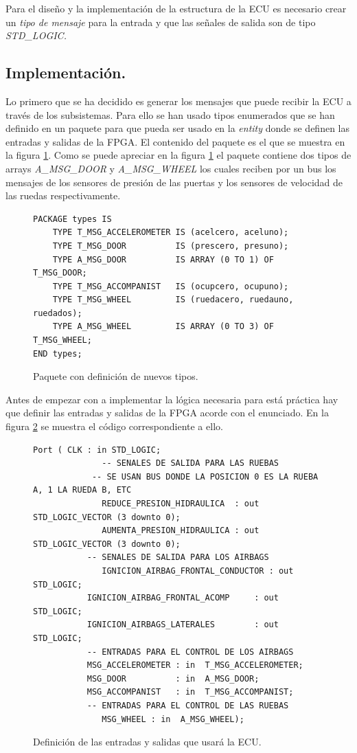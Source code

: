 \documentclass{article}
\begin{document}
Para el diseño y la implementación de la estructura de la ECU es necesario crear un \emph{tipo de mensaje} para la entrada y que las señales de salida son de tipo \emph{STD\_LOGIC.}

\subsection{Implementación.}

	Lo primero que se ha decidido es generar los mensajes que puede recibir la ECU a través de los subsistemas. Para ello se han usado tipos enumerados que se han definido en un paquete para que pueda ser usado en la \emph{entity} donde se definen las entradas y salidas de la FPGA. El contenido del paquete es el que se muestra en la figura \ref{cod:p4:package}. Como se puede apreciar en la figura \ref{cod:p4:package} el paquete contiene dos tipos de arrays \emph{A\_MSG\_DOOR} y \emph{A\_MSG\_WHEEL} los cuales reciben por un bus los mensajes de los sensores de presión de las puertas y los sensores de velocidad de las ruedas respectivamente.

\begin{figure}[h]
	\begin{lstlisting}[style=vhdl]
PACKAGE types IS
	TYPE T_MSG_ACCELEROMETER IS (acelcero, aceluno);
	TYPE T_MSG_DOOR          IS (prescero, presuno);
	TYPE A_MSG_DOOR          IS ARRAY (0 TO 1) OF T_MSG_DOOR;
	TYPE T_MSG_ACCOMPANIST   IS (ocupcero, ocupuno);
	TYPE T_MSG_WHEEL         IS (ruedacero, ruedauno, ruedados);
	TYPE A_MSG_WHEEL         IS ARRAY (0 TO 3) OF T_MSG_WHEEL;
END types;
	\end{lstlisting}
	\caption{Paquete con definición de nuevos tipos.}
	\label{cod:p4:package}
\end{figure}

Antes de empezar con a implementar la lógica necesaria para está práctica hay que definir las entradas y salidas de la FPGA acorde con el enunciado. En la figura \ref{cod:p4:entity} se muestra el código correspondiente a ello.

\begin{figure}[h]
	\begin{lstlisting}[style=vhdl]
    Port ( CLK : in STD_LOGIC;
			  -- SENALES DE SALIDA PARA LAS RUEBAS
	        -- SE USAN BUS DONDE LA POSICION 0 ES LA RUEBA A, 1 LA RUEDA B, ETC
			  REDUCE_PRESION_HIDRAULICA  : out  STD_LOGIC_VECTOR (3 downto 0);
			  AUMENTA_PRESION_HIDRAULICA : out  STD_LOGIC_VECTOR (3 downto 0);
           -- SENALES DE SALIDA PARA LOS AIRBAGS
			  IGNICION_AIRBAG_FRONTAL_CONDUCTOR : out  STD_LOGIC;
           IGNICION_AIRBAG_FRONTAL_ACOMP     : out  STD_LOGIC;
           IGNICION_AIRBAGS_LATERALES        : out  STD_LOGIC;
           -- ENTRADAS PARA EL CONTROL DE LOS AIRBAGS
           MSG_ACCELEROMETER : in  T_MSG_ACCELEROMETER;
           MSG_DOOR          : in  A_MSG_DOOR;
           MSG_ACCOMPANIST   : in  T_MSG_ACCOMPANIST;
           -- ENTRADAS PARA EL CONTROL DE LAS RUEBAS
			  MSG_WHEEL : in  A_MSG_WHEEL);
	\end{lstlisting}
	\caption{Definición de las entradas y salidas que usará la ECU.}
	\label{cod:p4:entity}
\end{figure}
\end{document}
